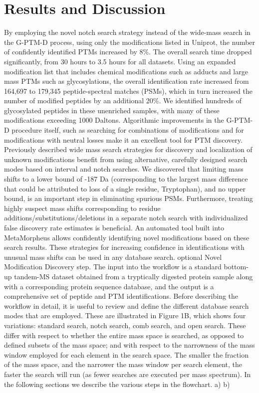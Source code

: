 \documentclass[journal=jprobs,manuscript=article]{achemso}
\begin{document}
\section{Results and Discussion}
By employing the novel notch search strategy instead of the wide-mass search in the G-PTM-D process, using only the modifications listed in Uniprot, the number of confidently identified PTMs increased by 8\%. The overall search time dropped significantly, from 30 hours to 3.5 hours for all datasets. Using an expanded modification list that includes chemical modifications such as adducts and large mass PTMs such as glycosylations, the overall identification rate increased from 164,697 to 179,345 peptide-spectral matches (PSMs), which in turn increased the number of modified peptides by an additional 20\%. We identified hundreds of glycosylated peptides in these unenriched samples, with many of these modifications exceeding 1000 Daltons. Algorithmic improvements in the G-PTM-D procedure itself, such as searching for combinations of modifications and for modifications with neutral losses make it an excellent tool for PTM discovery.
Previously described wide mass search strategies for discovery and localization of unknown modifications benefit from using alternative, carefully designed search modes based on interval and notch searches. We discovered that limiting mass shifts to a lower bound of -187 Da (corresponding to the largest mass difference that could be attributed to loss of a single residue, Tryptophan), and no upper bound, is an important step in eliminating spurious PSMs. Furthermore, treating highly suspect mass shifts corresponding to residue additions/substitutions/deletions in a separate notch search with individualized false discovery rate estimates is beneficial. An automated tool built into MetaMorpheus allows confidently identifying novel modifications based on these search results. These strategies for increasing confidence in identifications with unusual mass shifts can be used in any database search.
optional Novel Modification Discovery step. The input into the workflow is a standard bottom-up tandem-MS dataset obtained from a tryptically digested protein sample along with a corresponding protein sequence database, and the output is a comprehensive set of peptide and PTM identifications.  Before describing the workflow in detail, it is useful to review and define the different database search modes that are employed. These are illustrated in Figure 1B, which shows four variations: standard search, notch search, comb search, and open search. These differ with respect to whether the entire mass space is searched, as opposed to defined subsets of the mass space; and with respect to the narrowness of the mass window employed for each element in the search space.  The smaller the fraction of the mass space, and the narrower the mass window per search element, the faster the search will run (as fewer searches are executed per mass spectrum). In the following sections we describe the various steps in the flowchart.
a)	b)
 	    
\end{document}

